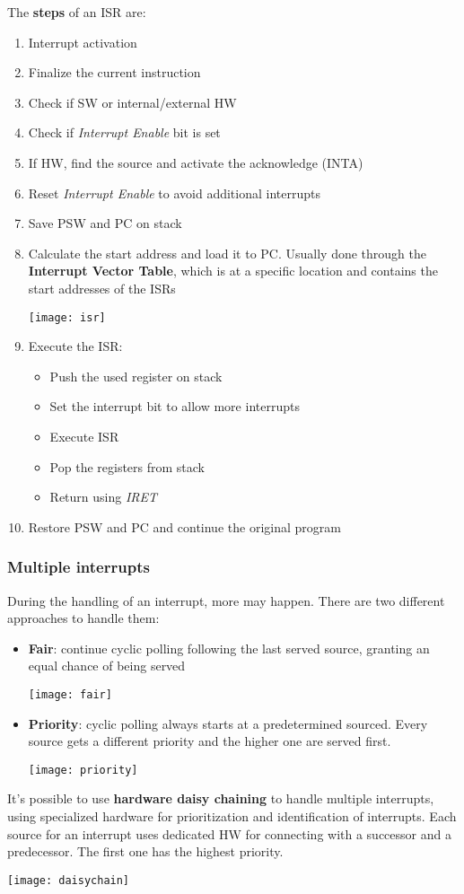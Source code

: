 \noindent The \textbf{steps} of an ISR are:
\begin{enumerate}
	\item Interrupt activation
	\item Finalize the current instruction
	\item Check if SW or internal/external HW
	\item Check if \textit{Interrupt Enable} bit is set
	\item If HW, find the source and activate the acknowledge (INTA)
	\item Reset \textit{Interrupt Enable} to avoid additional interrupts
	\item Save PSW and PC on stack
	\item Calculate the start address and load it to PC. Usually done through the \textbf{Interrupt Vector Table}, which is at a specific location and contains the start addresses of the ISRs
	\begin{center}
		\texttt{[image: isr]}
	\end{center}
	\item Execute the ISR:
	\begin{itemize}
		\item Push the used register on stack
		\item Set the interrupt bit to allow more interrupts
		\item Execute ISR
		\item Pop the registers from stack
		\item Return using \textit{IRET}
	\end{itemize}
	\item Restore PSW and PC and continue the original program
\end{enumerate}

\subsubsection{Multiple interrupts}
During the handling of an interrupt, more may happen. There are two different approaches to handle them:
\begin{itemize}
	\item \textbf{Fair}: continue cyclic polling following the last served source, granting an equal chance of being served
	\begin{center}
		\texttt{[image: fair]}
	\end{center}
	\item \textbf{Priority}: cyclic polling always starts at a predetermined sourced. Every source gets a different priority and the higher one are served first.
	\begin{center}
		\texttt{[image: priority]}
	\end{center}
\end{itemize}
It's possible to use \textbf{hardware daisy chaining} to handle multiple interrupts, using specialized hardware for prioritization and identification of interrupts. Each source for an interrupt uses dedicated HW for connecting with a successor and a predecessor. The first one has the highest priority.
\begin{center}
	\texttt{[image: daisychain]}
\end{center}